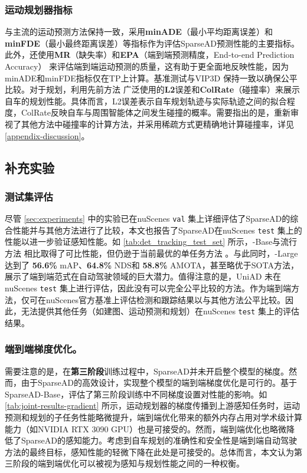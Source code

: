 \subsubsection{运动规划器指标}
与主流的运动预测方法保持一致，采用\textbf{minADE}（最小平均距离误差）和\textbf{minFDE}（最小最终距离误差）等指标作为评估SparseAD预测性能的主要指标。此外，还使用\textbf{MR}（缺失率）和\textbf{EPA}（端到端预测精度，End-to-end Prediction Accuracy）\cite{gu2023vip3d} 来评估端到端运动预测的质量，这有助于更全面地反映性能，因为minADE和minFDE指标仅在TP上计算。基准测试与VIP3D \cite{gu2023vip3d} 保持一致以确保公平比较。对于规划，利用先前方法 \cite{hu2023planning, jiang2023vad} 广泛使用的\textbf{L2}误差和\textbf{ColRate}（碰撞率）来展示自车的规划性能。具体而言，L2误差表示自车规划轨迹与实际轨迹之间的拟合程度，ColRate反映自车与周围智能体之间发生碰撞的概率。需要指出的是，重新审视了其他方法中碰撞率的计算方法，并采用稀疏方式更精确地计算碰撞率，详见 \cref{appendix-discussion}。

\subsection{补充实验}


\subsubsection{测试集评估}
尽管 \cref{sec:experiments} 中的实验已在nuScenes \texttt{val} 集上详细评估了SparseAD的综合性能并与其他方法进行了比较，本文也报告了SparseAD在nuScenes \texttt{test} 集上的性能以进一步验证感知性能。如 \cref{tab:det_tracking_test_set} 所示，\model-Base与流行方法 \cite{liu2023petrv2, li2022bevformer, lin2022sparse4d, shi2022srcn3d} 相比取得了可比性能，但仍逊于当前最优的单任务方法 \cite{lin2023sparse4d, wang2023exploring}。与此同时，\model-Large达到了 \textbf{56.6\%} mAP、\textbf{64.8\%} NDS和 \textbf{58.8\%} AMOTA，甚至略优于SOTA方法\cite{lin2023sparse4d}，展示了端到端范式在自动驾驶领域的巨大潜力。值得注意的是，UniAD\cite{hu2023planning} 未在nuScenes \texttt{test} 集上进行评估，因此没有可以完全公平比较的方法。作为端到端方法，仅可在nuScenes官方基准上评估检测和跟踪结果以与其他方法公平比较。因此，无法提供其他任务（如建图、运动预测和规划）在nuScenes \texttt{test} 集上的评估结果。



\subsubsection{端到端梯度优化。} 需要注意的是，在\textbf{第三阶段}训练过程中，SparseAD并未开启整个模型的梯度。然而，由于SparseAD的高效设计，实现整个模型的端到端梯度优化是可行的。基于SparseAD-Base，评估了第三阶段训练中不同梯度设置对性能的影响。如 \cref{tab:joint-results-gradient} 所示，运动规划器的梯度传播到上游感知任务时，运动预测和规划的子任务性能略微提升，端到端优化带来的额外内存占用对学术级计算能力（如NVIDIA RTX 3090 GPU）也是可接受的。然而，端到端优化也略微降低了SparseAD的感知能力。考虑到自车规划的准确性和安全性是端到端自动驾驶方法的最终目标，感知性能的轻微下降在此处是可接受的。总体而言，本文认为第三阶段的端到端优化可以被视为感知与规划性能之间的一种权衡。

